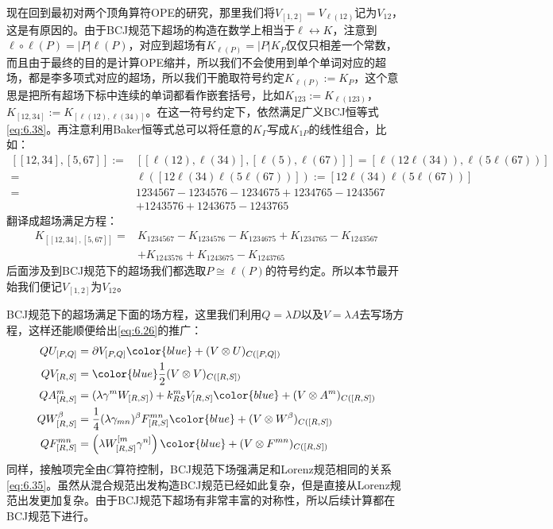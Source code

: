 现在回到最初对两个顶角算符OPE的研究，那里我们将$V_{[1,2]}=V_{\ell(12)}$记为$V_{12}$，这是有原因的。由于BCJ规范下超场的构造在数学上相当于$\ell\leftrightarrow K$，注意到$\ell\circ\ell(P) = |P|\ell (P)$，对应到超场有$K_{\ell(P)} = |P|K_P$仅仅只相差一个常数，而且由于最终的目的是计算OPE缩并，所以我们不会使用到单个单词对应的超场，都是李多项式对应的超场，所以我们干脆取符号约定$K_{\ell(P)} := K_P$，这个意思是把所有超场下标中连续的单词都看作嵌套括号，比如$K_{123}:=K_{\ell(123)}$，$K_{[12,34]}:=K_{[\ell(12),\ell(34)]}$。在这一符号约定下，依然满足广义BCJ恒等式\ref{eq:6.38}。再注意利用Baker恒等式总可以将任意的$K_\Gamma$写成$K_{1P}$的线性组合，比如：
\begin{equation}
	\begin{aligned}
		[[12,34],[5,67]]:=&[[\ell(12),\ell(34)],[\ell(5),\ell(67)]]=[\ell(12\ell(34)),\ell(5\ell(67))]\\
		=&\ell([12\ell(34)\ell(5\ell(67))]):=[12\ell(34)\ell(5\ell(67))]\\
		=&1234567-1234576-1234675+1234765-1243567\\
		&+1243576+1243675-1243765
	\end{aligned}
\end{equation}
翻译成超场满足方程：
\begin{align*}
	K_{[[12,34],[5,67]]}=&K_{1234567}-K_{1234576}-K_{1234675}+K_{1234765}-K_{1243567}\\
	&+K_{1243576}+K_{1243675}-K_{1243765}
\end{align*}
后面涉及到BCJ规范下的超场我们都选取$P\cong\ell(P)$的符号约定。所以本节最开始我们便记$V_{[1,2]}$为$V_{12}$。

BCJ规范下的超场满足下面的场方程，这里我们利用$Q=\lambda D$以及$V=\lambda A$去写场方程，这样还能顺便给出\ref{eq:6.26}的推广：
\begin{equation}
	\label{eq:6.46}
	\begin{aligned}
		QU_{[P,Q]}&=\partial V_{[P,Q]}{\color{blue}+(V\otimes U)_{C([P,Q])}}\\
		QV_{[R,S]}&={\color{blue}\frac{1}{2}(V\otimes V)_{  {C}([R,S])}}
		\\QA_{[R,S]}^m&=(\lambda\gamma^mW_{[R,S]})+k_{RS}^mV_{[R,S]}{\color{blue}+(V\otimes A^m)_{C([R,S])}}
		\\QW_{[R,S]}^{\beta}&=\frac{1}{4}(\lambda\gamma_{mn})^\beta F_{[R,S]}^{mn}{\color{blue}+(V\otimes W^\beta)_{C([R,S])}}
		\\QF_{[R,S]}^{mn}&=\left(\lambda W_{[R,S]}^{[m}\gamma^{n]}\right){\color{blue}+(V\otimes F^{mn})_{  {C}([R,S])}}
	\end{aligned}
\end{equation}
同样，接触项完全由$C$算符控制，BCJ规范下场强满足和Lorenz规范相同的关系\ref{eq:6.35}。虽然从混合规范出发构造BCJ规范已经如此复杂，但是直接从Lorenz规范出发更加复杂\cite{Bridges:2019siz}。由于BCJ规范下超场有非常丰富的对称性，所以后续计算都在BCJ规范下进行。
